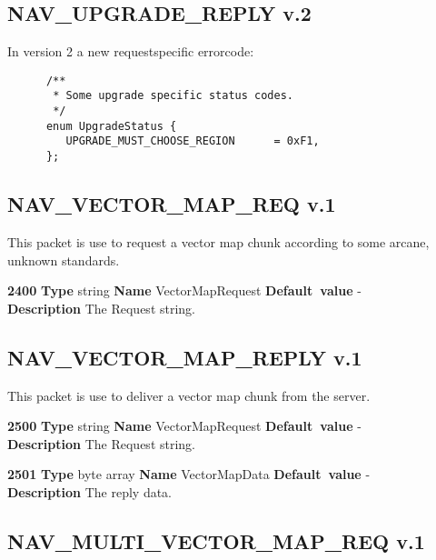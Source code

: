 \documentclass[a4paper]{article}
\begin{document}
\subsection{NAV\_UPGRADE\_REPLY v.2}

In version 2 a new requestspecific errorcode:
\begin{verbatim}
      /**
       * Some upgrade specific status codes.
       */
      enum UpgradeStatus {
         UPGRADE_MUST_CHOOSE_REGION      = 0xF1,
      };
\end{verbatim}


\subsection{NAV\_VECTOR\_MAP\_REQ v.1}

This packet is use to request a vector map chunk according to some
arcane, unknown standards.

\begin{list}{\textbf{ParamID}}{}
\item \textbf{2400} \textbf{Type} string \textbf{Name} VectorMapRequest
                 \textbf{Default~value} - \\
  \label{VectorMapRequest}
  \textbf{Description} The Request string.
\end{list}


\subsection{NAV\_VECTOR\_MAP\_REPLY v.1}

This packet is use to deliver a vector map chunk from the server.

\begin{list}{\textbf{ParamID}}{}
\item \textbf{2500} \textbf{Type} string \textbf{Name} VectorMapRequest
                 \textbf{Default~value} - \\
  \textbf{Description} The Request string.
\item \textbf{2501} \textbf{Type} byte array \textbf{Name} VectorMapData
                 \textbf{Default~value} - \\
  \label{VectorMapData}
  \textbf{Description} The reply data.
\end{list}


\subsection{NAV\_MULTI\_VECTOR\_MAP\_REQ v.1}
\end{document}
